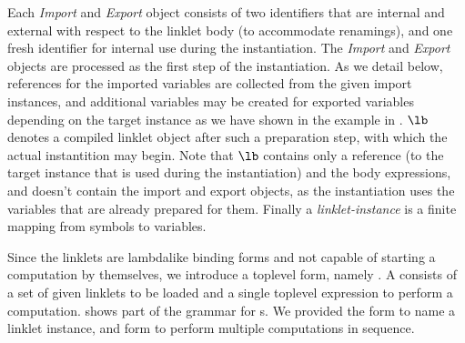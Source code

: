 		\begin{paragraph-here}
			Each \emph{Import} and \emph{Export} object consists of two
			identifiers that are internal and external with respect to the linklet
			body (to accommodate renamings), and one fresh identifier for internal
			use during the instantiation. The \emph{Import} and \emph{Export}
			objects are processed as the first step of the instantiation. As we
			detail below, references for the imported variables are collected from
			the given import instances, and additional variables may be created
			for exported variables depending on the target instance as we have
			shown in the example in . $\lb$
			denotes a compiled linklet object after such a preparation step, with
			which the actual instantition may begin. Note that $\lb$ contains only
			a reference (to the target instance that is used during the
			instantiation) and the body expressions, and doesn't contain the
			import and export objects, as the instantiation uses the variables
			that are already prepared for them. Finally
			a \emph{linklet-instance} is a finite mapping from symbols to
			variables.
		\end{paragraph-here}

		\begin{paragraph-here}
			Since the linklets are lambda\dash like binding forms and not capable
			of starting a computation by themselves, we introduce a top\dash level
			form, namely . A  consists of
			a set of given linklets to be loaded and a single top\dash level
			expression to perform a computation. \figref{fig:linklet-program}
			shows part of the grammar for s. We provided
			the  form to name a linklet instance,
			and  form to perform multiple computations in
			sequence.
		\end{paragraph-here}

